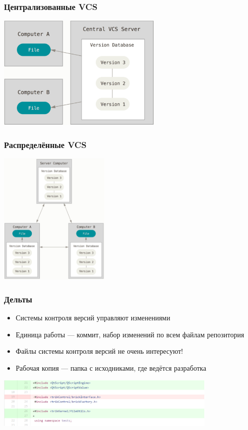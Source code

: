 \documentclass{../slides-style}
\begin{document}
    \begin{frame}
        \frametitle{Централизованные VCS}
        \begin{center}
            \includegraphics[width=0.6\textwidth]{centralizedVcs.png}
        \end{center}
    \end{frame}

    \begin{frame}
        \frametitle{Распределённые VCS}
        \begin{center}
            \includegraphics[width=0.4\textwidth]{distributedVcs.png}
        \end{center}
    \end{frame}

    \begin{frame}
        \frametitle{Дельты}
        \begin{itemize}
            \item Системы контроля версий управляют изменениями
            \item Единица работы --- коммит, набор изменений по всем файлам репозитория
            \item Файлы системы контроля версий не очень интересуют!
            \item Рабочая копия --- папка с исходниками, где ведётся разработка
        \end{itemize}
        \begin{center}
            \includegraphics[width=0.8\textwidth]{delta.png}
        \end{center}
    \end{frame}
\end{document}
